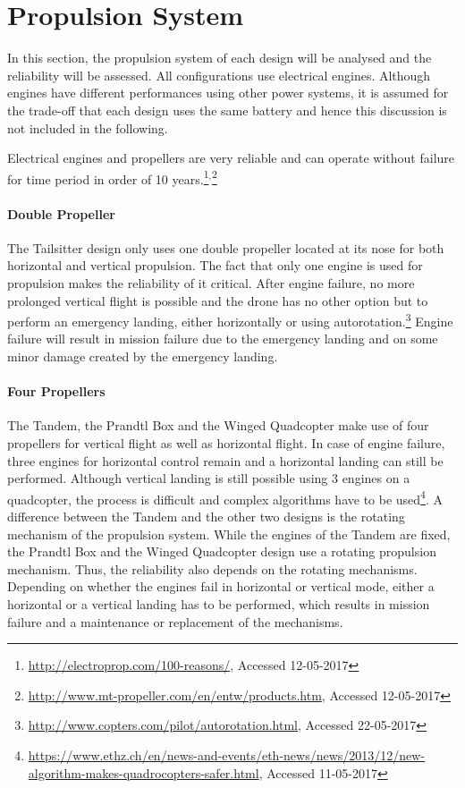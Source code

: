 \section{Propulsion System}

In this section, the propulsion system of each design will be analysed and the reliability will be assessed. All configurations use electrical engines. Although engines have different performances using other power systems, it is assumed for the trade-off that each design uses the same battery and hence this discussion is not included in the following. 


Electrical engines and propellers are very reliable and can operate without failure for time period in order of 10 years.\footnote{\url{http://electroprop.com/100-reasons/}, Accessed 12-05-2017}$^,$\footnote{\url{http://www.mt-propeller.com/en/entw/products.htm}, Accessed 12-05-2017}

\paragraph{Double Propeller}
The Tailsitter design only uses one double propeller located at its nose for both horizontal and vertical propulsion. The fact that only one engine is used for propulsion makes the reliability of it critical. After engine failure, no more prolonged vertical flight is possible and the drone has no other option but to perform an emergency landing, either horizontally or using autorotation.\footnote{\url{http://www.copters.com/pilot/autorotation.html}, Accessed 22-05-2017} Engine failure will result in mission failure due to the emergency landing and on some minor damage created by the emergency landing.

\paragraph{Four Propellers}
The Tandem, the Prandtl Box and the Winged Quadcopter make use of four propellers for vertical flight as well as horizontal flight. In case of engine failure, three engines for horizontal control remain and a horizontal landing can still be performed. Although vertical landing is still possible using 3 engines on a quadcopter, the process is difficult and complex algorithms have to be used\footnote{\url{https://www.ethz.ch/en/news-and-events/eth-news/news/2013/12/new-algorithm-makes-quadrocopters-safer.html}, Accessed 11-05-2017}.
A difference between the Tandem and the other two designs is the rotating mechanism of the propulsion system. While the engines of the Tandem are fixed, the Prandtl Box and the Winged Quadcopter design use a rotating propulsion mechanism. Thus, the reliability also depends on the rotating mechanisms. Depending on whether the engines fail in horizontal or vertical mode, either a horizontal or a vertical landing has to be performed, which results in mission failure and a maintenance or replacement of the mechanisms.


